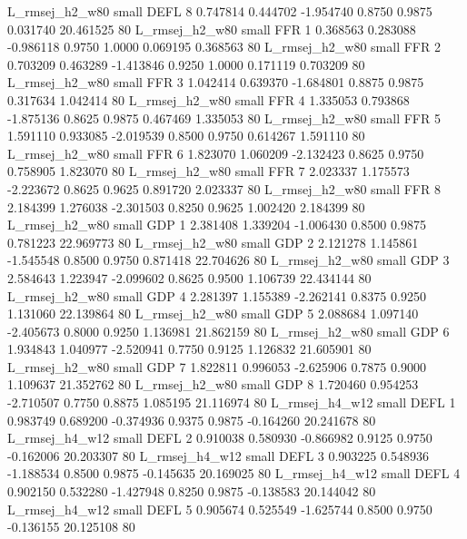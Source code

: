 L_rmsej_h2_w80      small     DEFL                 8 0.747814 0.444702 -1.954740 0.8750 0.9875  0.031740   20.461525 80
L_rmsej_h2_w80      small      FFR                 1 0.368563 0.283088 -0.986118 0.9750 1.0000  0.069195    0.368563 80
L_rmsej_h2_w80      small      FFR                 2 0.703209 0.463289 -1.413846 0.9250 1.0000  0.171119    0.703209 80
L_rmsej_h2_w80      small      FFR                 3 1.042414 0.639370 -1.684801 0.8875 0.9875  0.317634    1.042414 80
L_rmsej_h2_w80      small      FFR                 4 1.335053 0.793868 -1.875136 0.8625 0.9875  0.467469    1.335053 80
L_rmsej_h2_w80      small      FFR                 5 1.591110 0.933085 -2.019539 0.8500 0.9750  0.614267    1.591110 80
L_rmsej_h2_w80      small      FFR                 6 1.823070 1.060209 -2.132423 0.8625 0.9750  0.758905    1.823070 80
L_rmsej_h2_w80      small      FFR                 7 2.023337 1.175573 -2.223672 0.8625 0.9625  0.891720    2.023337 80
L_rmsej_h2_w80      small      FFR                 8 2.184399 1.276038 -2.301503 0.8250 0.9625  1.002420    2.184399 80
L_rmsej_h2_w80      small      GDP                 1 2.381408 1.339204 -1.006430 0.8500 0.9875  0.781223   22.969773 80
L_rmsej_h2_w80      small      GDP                 2 2.121278 1.145861 -1.545548 0.8500 0.9750  0.871418   22.704626 80
L_rmsej_h2_w80      small      GDP                 3 2.584643 1.223947 -2.099602 0.8625 0.9500  1.106739   22.434144 80
L_rmsej_h2_w80      small      GDP                 4 2.281397 1.155389 -2.262141 0.8375 0.9250  1.131060   22.139864 80
L_rmsej_h2_w80      small      GDP                 5 2.088684 1.097140 -2.405673 0.8000 0.9250  1.136981   21.862159 80
L_rmsej_h2_w80      small      GDP                 6 1.934843 1.040977 -2.520941 0.7750 0.9125  1.126832   21.605901 80
L_rmsej_h2_w80      small      GDP                 7 1.822811 0.996053 -2.625906 0.7875 0.9000  1.109637   21.352762 80
L_rmsej_h2_w80      small      GDP                 8 1.720460 0.954253 -2.710507 0.7750 0.8875  1.085195   21.116974 80
L_rmsej_h4_w12      small     DEFL                 1 0.983749 0.689200 -0.374936 0.9375 0.9875 -0.164260   20.241678 80
L_rmsej_h4_w12      small     DEFL                 2 0.910038 0.580930 -0.866982 0.9125 0.9750 -0.162006   20.203307 80
L_rmsej_h4_w12      small     DEFL                 3 0.903225 0.548936 -1.188534 0.8500 0.9875 -0.145635   20.169025 80
L_rmsej_h4_w12      small     DEFL                 4 0.902150 0.532280 -1.427948 0.8250 0.9875 -0.138583   20.144042 80
L_rmsej_h4_w12      small     DEFL                 5 0.905674 0.525549 -1.625744 0.8500 0.9750 -0.136155   20.125108 80
